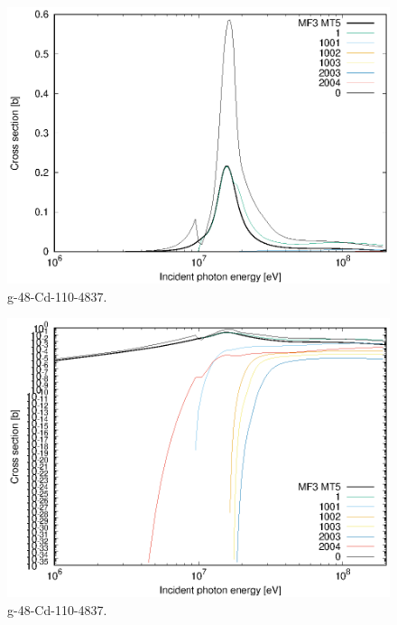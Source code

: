 \begin{figure}
 \includegraphics[width=\linewidth]{eps/g_48-Cd-110_4837.eps}
  \caption{g-48-Cd-110-4837.}
\end{figure}
\begin{figure}
 \includegraphics[width=\linewidth]{eps-log/g_48-Cd-110_4837.eps}
 \caption{g-48-Cd-110-4837.}
\end{figure}
\newpage \clearpage

